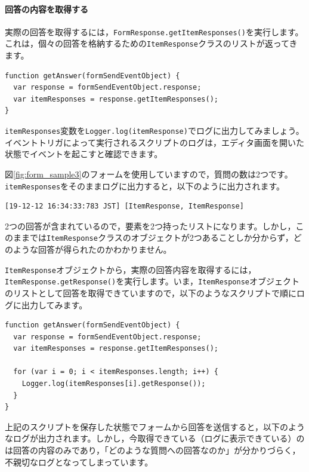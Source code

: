 \documentclass[uplatex,a4j]{jsarticle}
\begin{document}
\paragraph{回答の内容を取得する}

実際の回答を取得するには，\verb|FormResponse.getItemResponses()|を実行します。これは，個々の回答を格納するための\verb|ItemResponse|クラスのリストが返ってきます。

\begin{lstlisting}[basicstyle=\ttfamily\footnotesize,frame=single,caption=Event Object sample 2]
function getAnswer(formSendEventObject) {
  var response = formSendEventObject.response;
  var itemResponses = response.getItemResponses();
}
\end{lstlisting}

\verb|itemResponses|変数を\verb|Logger.log(itemResponse)|でログに出力してみましょう。イベントトリガによって実行されるスクリプトのログは，エディタ画面を開いた状態でイベントを起こすと確認できます。


図\ref{fig:form_sample3}のフォームを使用していますので，質問の数は2つです。\verb|itemResponses|をそのままログに出力すると，以下のように出力されます。

\begin{lstlisting}[basicstyle=\ttfamily\footnotesize,frame=single,caption=Event Object output example 1]
[19-12-12 16:34:33:783 JST] [ItemResponse, ItemResponse]
\end{lstlisting}

2つの回答が含まれているので，要素を2つ持ったリストになります。しかし，このままでは\verb|ItemResponse|クラスのオブジェクトが2つあることしか分からず，どのような回答が得られたのかわかりません。


\verb|ItemResponse|オブジェクトから，実際の回答内容を取得するには，\verb|ItemResponse.getResponse()|を実行します。いま，\verb|ItemResponse|オブジェクトのリストとして回答を取得できていますので，以下のようなスクリプトで順にログに出力してみます。

\begin{lstlisting}[basicstyle=\ttfamily\footnotesize,frame=single,caption=Event Object sample 3]
function getAnswer(formSendEventObject) {
  var response = formSendEventObject.response;
  var itemResponses = response.getItemResponses();
  
  for (var i = 0; i < itemResponses.length; i++) {
    Logger.log(itemResponses[i].getResponse());
  }
}
\end{lstlisting}

上記のスクリプトを保存した状態でフォームから回答を送信すると，以下のようなログが出力されます。しかし，今取得できている（ログに表示できている）のは回答の内容のみであり，「どのような質問への回答なのか」が分かりづらく，不親切なログとなってしまっています。
\end{document}
